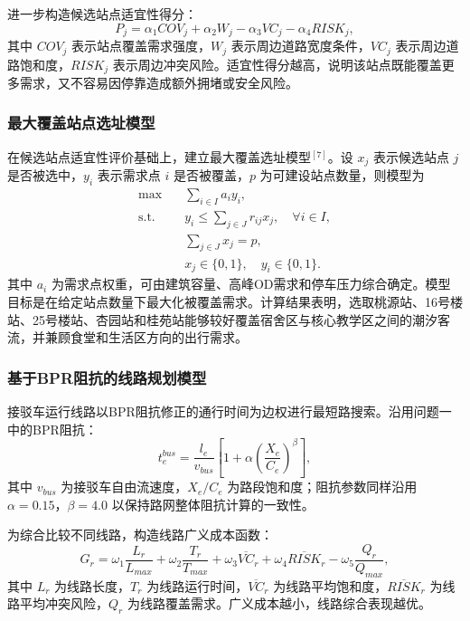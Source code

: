 \documentclass[UTF8,zihao=-4,a4paper]{ctexart}
\numberwithin{table}{section}
\numberwithin{figure}{section}
\numberwithin{equation}{section}
\begin{document}
进一步构造候选站点适宜性得分：
\begin{equation}
P_j=\alpha_1 COV_j+\alpha_2 W_j-\alpha_3 VC_j-\alpha_4 RISK_j,
\end{equation}
其中 $COV_j$ 表示站点覆盖需求强度，$W_j$ 表示周边道路宽度条件，$VC_j$ 表示周边道路饱和度，$RISK_j$ 表示周边冲突风险。适宜性得分越高，说明该站点既能覆盖更多需求，又不容易因停靠造成额外拥堵或安全风险。

\subsubsection{最大覆盖站点选址模型}

在候选站点适宜性评价基础上，建立最大覆盖选址模型$^{[7]}$。设 $x_j$ 表示候选站点 $j$ 是否被选中，$y_i$ 表示需求点 $i$ 是否被覆盖，$p$ 为可建设站点数量，则模型为
\begin{equation}
\begin{aligned}
\max \quad & \sum_{i\in I} a_i y_i,\\
\text{s.t.}\quad & y_i\le \sum_{j\in J} r_{ij}x_j,\quad \forall i\in I,\\
& \sum_{j\in J}x_j=p,\\
& x_j\in\{0,1\},\quad y_i\in\{0,1\}.
\end{aligned}
\end{equation}
其中 $a_i$ 为需求点权重，可由建筑容量、高峰OD需求和停车压力综合确定。模型目标是在给定站点数量下最大化被覆盖需求。计算结果表明，选取桃源站、16号楼站、25号楼站、杏园站和桂苑站能够较好覆盖宿舍区与核心教学区之间的潮汐客流，并兼顾食堂和生活区方向的出行需求。

\subsubsection{基于BPR阻抗的线路规划模型}

接驳车运行线路以BPR阻抗修正的通行时间为边权进行最短路搜索。沿用问题一中的BPR阻抗：
\begin{equation}
t_e^{bus}=\frac{l_e}{v_{bus}}\left[1+\alpha\left(\frac{X_e}{C_e}\right)^\beta\right],
\end{equation}
其中 $v_{bus}$ 为接驳车自由流速度，$X_e/C_e$ 为路段饱和度；阻抗参数同样沿用 $\alpha=0.15$，$\beta=4.0$ 以保持路网整体阻抗计算的一致性。

为综合比较不同线路，构造线路广义成本函数：
\begin{equation}
G_r=\omega_1\frac{L_r}{L_{max}}+\omega_2\frac{T_r}{T_{max}}+\omega_3\overline{VC}_r+\omega_4\overline{RISK}_r-\omega_5\frac{Q_r}{Q_{max}},
\end{equation}
其中 $L_r$ 为线路长度，$T_r$ 为线路运行时间，$\overline{VC}_r$ 为线路平均饱和度，$\overline{RISK}_r$ 为线路平均冲突风险，$Q_r$ 为线路覆盖需求。广义成本越小，线路综合表现越优。
\end{document}
